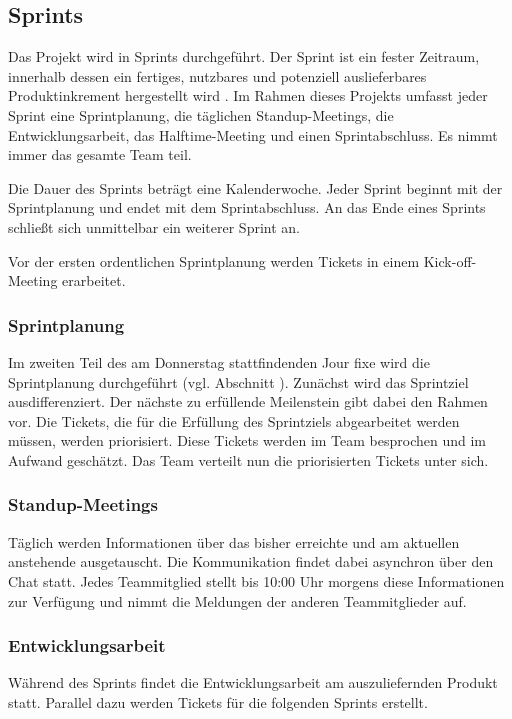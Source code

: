 \documentclass[a4paper,11pt,listof=numbered,glossary=totoc,parskip=half,toc=bib]{scrreprt}
\begin{document}
{\subsection{Sprints}
Das Projekt wird in Sprints durchgeführt. Der Sprint ist ein fester Zeitraum, innerhalb dessen ein fertiges, nutzbares und potenziell auslieferbares Produktinkrement hergestellt wird \autocite[S.9]{Scrum}. Im Rahmen dieses Projekts umfasst jeder Sprint eine Sprintplanung, die täglichen Standup-Meetings, die Entwicklungsarbeit, das Halftime-Meeting und einen Sprintabschluss. Es nimmt immer das gesamte Team teil.

Die Dauer des Sprints beträgt eine Kalenderwoche. Jeder Sprint beginnt mit der Sprintplanung und endet mit dem Sprintabschluss. An das Ende eines Sprints schließt sich unmittelbar ein weiterer Sprint an.

Vor der ersten ordentlichen Sprintplanung werden Tickets in einem Kick-off-Meeting erarbeitet.

\subsubsection{Sprintplanung}
Im zweiten Teil des am Donnerstag stattfindenden Jour fixe wird die Sprintplanung durchgeführt (vgl. Abschnitt ). Zunächst wird das Sprintziel ausdifferenziert. Der nächste zu erfüllende Meilenstein gibt dabei den Rahmen vor. 
Die Tickets, die für die Erfüllung des Sprintziels abgearbeitet werden müssen, werden priorisiert. Diese Tickets werden im Team besprochen und im Aufwand geschätzt. Das Team verteilt nun die priorisierten Tickets unter sich.

\subsubsection{Standup-Meetings}
Täglich werden Informationen über das bisher erreichte und am aktuellen anstehende ausgetauscht. Die Kommunikation findet dabei asynchron über den Chat statt. Jedes Teammitglied stellt bis 10:00 Uhr morgens diese Informationen zur Verfügung und nimmt die Meldungen der anderen Teammitglieder auf.

\subsubsection{Entwicklungsarbeit}
Während des Sprints findet die Entwicklungsarbeit am auszuliefernden Produkt statt. Parallel dazu werden Tickets für die folgenden Sprints erstellt.

}
\end{document}
